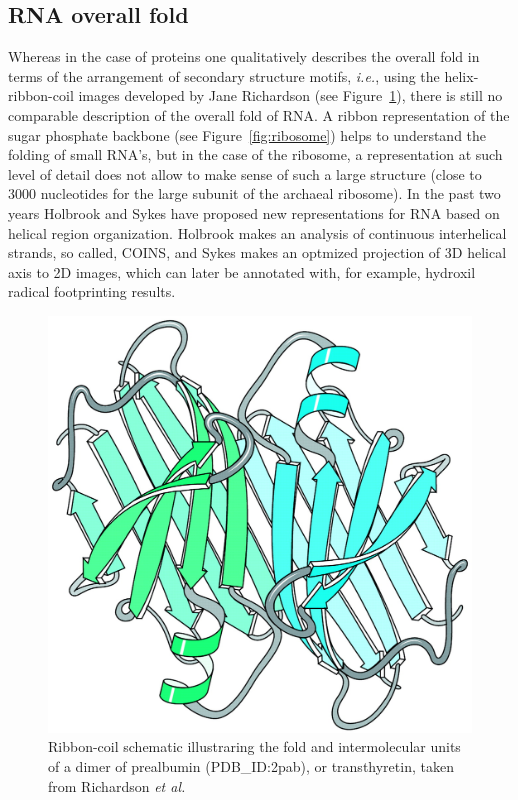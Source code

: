 \subsection{RNA  overall fold}
Whereas  in  the case  of  proteins  one  qualitatively describes  the
overall  fold  in terms  of  the  arrangement  of secondary  structure
motifs, \textit{i.e.}, using the helix-ribbon-coil images developed by
Jane           Richardson          \cite{richardson2000}          (see
Figure~\ref{fig:ribboncoil}), there is still no comparable description
of  the overall  fold of  RNA. A  ribbon representation  of  the sugar
phosphate backbone (see Figure~\ref{fig:ribosome}) helps to understand
the  folding of  small  RNA's, but  in  the case  of  the ribosome,  a
representation at such level of detail does not allow to make sense of
such  a large  structure  (close  to 3000  nucleotides  for the  large
subunit of  the archaeal  ribosome).  In the  past two  years Holbrook
\cite{holbrook2008}  and  Sykes  \cite{sykes2009}  have  proposed  new
representations for RNA based on helical region organization. Holbrook
makes  an  analysis of  continuous  interhelical  strands, so  called,
COINS, and Sykes makes an optmized projection of 3D helical axis to 2D
images,  which can  later  be annotated  with,  for example,  hydroxil
radical footprinting results.

\begin{figure}[ht]
\centering
\includegraphics[scale=0.4]{Chapter1/overallfold.png}
\caption{Ribbon-coil    schematic    illustraring    the   fold    and
  intermolecular  units of  a dimer  of prealbumin  (PDB\_ID:2pab), or
  transthyretin,    taken     from    Richardson    \textit{et    al.}
  \cite{richardson2002}}
\label{fig:ribboncoil}
\end{figure}

